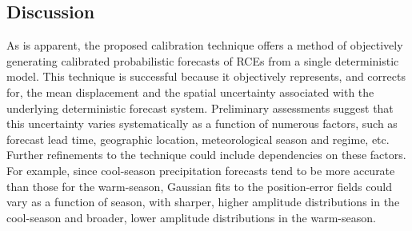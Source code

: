 \subsection{Discussion}
\label{ddiscussion}
As is apparent, the proposed calibration technique offers a method of objectively generating calibrated probabilistic forecasts of RCEs from a single deterministic model.
This technique is successful because it objectively represents, and corrects for, the mean displacement and the spatial uncertainty associated with the underlying deterministic forecast system.
Preliminary assessments suggest that this uncertainty varies systematically as a function of numerous factors, such as forecast lead time, geographic location, meteorological season and regime, etc.
Further refinements to the technique could include dependencies on these factors.
For example, since cool-season precipitation forecasts tend to be more accurate than those for the warm-season, Gaussian fits to the position-error fields could vary as a function of season, with sharper, higher amplitude distributions in the cool-season and broader, lower amplitude distributions in the warm-season.



